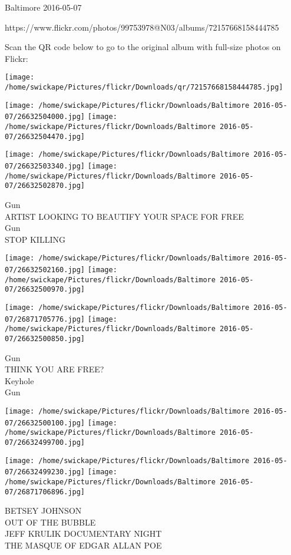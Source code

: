 \documentclass[10pt,letterpaper]{article}
\begin{document}
Baltimore 2016-05-07

https://www.flickr.com/photos/99753978@N03/albums/72157668158444785

Scan the QR code below to go to the original album with full-size photos on Flickr:

\texttt{[image: /home/swickape/Pictures/flickr/Downloads/qr/72157668158444785.jpg]}
\pagebreak

\texttt{[image: /home/swickape/Pictures/flickr/Downloads/Baltimore 2016-05-07/26632504000.jpg]}
\texttt{[image: /home/swickape/Pictures/flickr/Downloads/Baltimore 2016-05-07/26632504470.jpg]}

\texttt{[image: /home/swickape/Pictures/flickr/Downloads/Baltimore 2016-05-07/26632503340.jpg]}
\texttt{[image: /home/swickape/Pictures/flickr/Downloads/Baltimore 2016-05-07/26632502870.jpg]}

Gun\\
ARTIST LOOKING TO BEAUTIFY YOUR SPACE FOR FREE\\
Gun\\
STOP KILLING
\pagebreak

\texttt{[image: /home/swickape/Pictures/flickr/Downloads/Baltimore 2016-05-07/26632502160.jpg]}
\texttt{[image: /home/swickape/Pictures/flickr/Downloads/Baltimore 2016-05-07/26632500970.jpg]}

\texttt{[image: /home/swickape/Pictures/flickr/Downloads/Baltimore 2016-05-07/26871705776.jpg]}
\texttt{[image: /home/swickape/Pictures/flickr/Downloads/Baltimore 2016-05-07/26632500850.jpg]}

Gun\\
THINK YOU ARE FREE?\\
Keyhole\\
Gun
\pagebreak

\texttt{[image: /home/swickape/Pictures/flickr/Downloads/Baltimore 2016-05-07/26632500100.jpg]}
\texttt{[image: /home/swickape/Pictures/flickr/Downloads/Baltimore 2016-05-07/26632499700.jpg]}

\texttt{[image: /home/swickape/Pictures/flickr/Downloads/Baltimore 2016-05-07/26632499230.jpg]}
\texttt{[image: /home/swickape/Pictures/flickr/Downloads/Baltimore 2016-05-07/26871706896.jpg]}

BETSEY JOHNSON\\
OUT OF THE BUBBLE\\
JEFF KRULIK DOCUMENTARY NIGHT\\
THE MASQUE OF EDGAR ALLAN POE
\pagebreak
\end{document}
